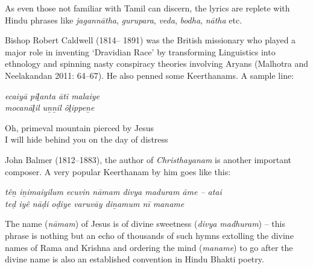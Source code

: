 \begin{myquote}
\end{myquote}

As even those not familiar with Tamil can discern, the lyrics are replete with Hindu phrases like \textit{jagannātha}, \textit{gurupara}, \textit{veda}, \textit{bodha}, \textit{nātha} etc.

Bishop Robert Caldwell (1814– 1891) was the British missionary who played a major role in inventing ‘Dravidian Race’ by transforming Linguistics into ethnology and spinning nasty conspiracy theories involving Aryans (Malhotra and Neelakandan 2011: 64–67). He also penned some Keerthanams. A sample line:

\begin{myquote}
\textit{ecaiyā pil̤anta āti malaiye\\ mocanāl̤il uṉṉil ôl̤ippeṉe }
\end{myquote}

\begin{myquote}
\end{myquote}

\begin{myquote}
Oh, primeval mountain pierced by Jesus\\ I will hide behind you on the day of distress
\end{myquote}

John Balmer (1812–1883), the author of \textit{Christhayanam} is another important composer. A very popular Keerthanam by him goes like this:

\begin{myquote}
\textit{têṉ iṉimaiyilum ecuvin nāmam divya maduram āme – atai\\ teḍ iyê nāḍi oḍiye varuvāy diṉamum nī maname}
\end{myquote}

\begin{myquote}
\end{myquote}

The name (\textit{nāmam}) of Jesus is of divine sweetness (\textit{divya madhuram}) – this phrase is nothing but an echo of thousands of such hymns extolling the divine names of Rama and Krishna and ordering the mind (\textit{maname}) to go after the divine name is also an established convention in Hindu Bhakti poetry.

